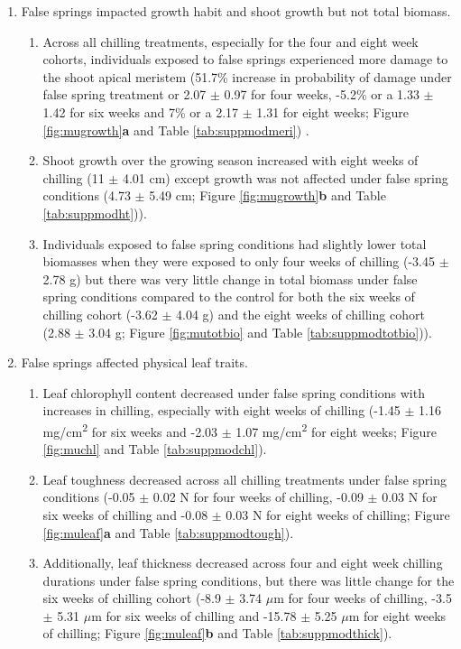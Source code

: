 \documentclass{article}\usepackage[]{graphicx}\usepackage[]{color}
\begin{document}
\begin{enumerate}
\item False springs impacted growth habit and shoot growth but not total biomass. 
  \begin{enumerate} %
  \item Across all chilling treatments, especially for the four and eight week cohorts, individuals exposed to false springs experienced more damage to the shoot apical meristem (51.7\% increase in probability of damage under false spring treatment or 2.07 $\pm$ 0.97 for four weeks, -5.2\% or a 1.33 $\pm$ 1.42 for six weeks and 7\% or a 2.17 $\pm$ 1.31 for eight weeks; Figure \ref{fig:mugrowth}\textbf{a} and Table \ref{tab:suppmodmeri}) .
  \item Shoot growth over the growing season increased with eight weeks of chilling (11 $\pm$ 4.01 cm) except growth was not affected under false spring conditions (4.73 $\pm$ 5.49 cm; Figure \ref{fig:mugrowth}\textbf{b} and Table \ref{tab:suppmodht})). 
  \item Individuals exposed to false spring conditions had slightly lower total biomasses when they were exposed to only four weeks of chilling (-3.45 $\pm$ 2.78 g) but there was very little change in total biomass under false spring conditions compared to the control for both the six weeks of chilling cohort (-3.62 $\pm$ 4.04 g) and the eight weeks of chilling cohort (2.88 $\pm$ 3.04 g; Figure \ref{fig:mutotbio} and Table \ref{tab:suppmodtotbio})).
  \end{enumerate}
  
\item False springs affected physical leaf traits.
  \begin{enumerate}
  \item Leaf chlorophyll content decreased under false spring conditions with increases in chilling, especially with eight weeks of chilling (-1.45 $\pm$ 1.16 mg/cm\textsuperscript{2} for six weeks and -2.03 $\pm$ 1.07 mg/cm\textsuperscript{2} for eight weeks; Figure \ref{fig:muchl} and Table \ref{tab:suppmodchl}).
  \item Leaf toughness decreased across all chilling treatments under false spring conditions (-0.05 $\pm$ 0.02 N for four weeks of chilling, -0.09 $\pm$ 0.03 N for six weeks of chilling and -0.08 $\pm$ 0.03 N for eight weeks of chilling; Figure \ref{fig:muleaf}\textbf{a} and Table \ref{tab:suppmodtough}).
  \item Additionally, leaf thickness decreased across four and eight week chilling durations under false spring conditions, but there was little change for the six weeks of chilling cohort (-8.9 $\pm$ 3.74 $\mu$m for four weeks of chilling, -3.5 $\pm$ 5.31 $\mu$m for six weeks of chilling and -15.78 $\pm$ 5.25 $\mu$m for eight weeks of chilling; Figure \ref{fig:muleaf}\textbf{b} and Table \ref{tab:suppmodthick}).
  \end{enumerate}
  

\end{enumerate}
\end{document}
